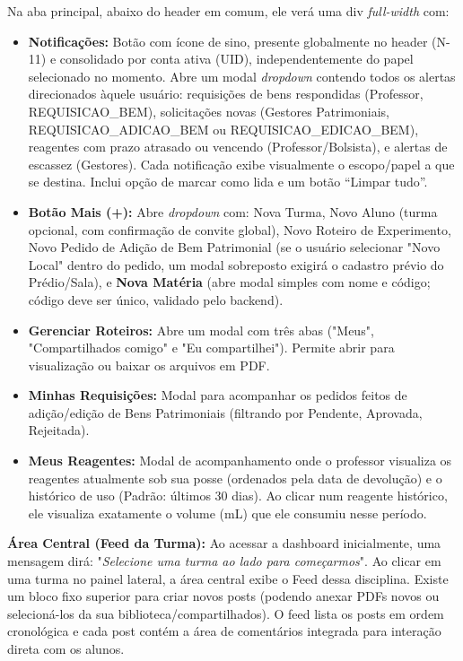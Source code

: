 Na aba principal, abaixo do header em comum, ele verá uma div \textit{full-width} com:
\begin{itemize}
    \item \textbf{Notificações:} Botão com ícone de sino, presente globalmente no header (N-11) e consolidado por conta ativa (UID), independentemente do papel selecionado no momento. Abre um modal \textit{dropdown} contendo todos os alertas direcionados àquele usuário: requisições de bens respondidas (Professor, REQUISICAO\_BEM), solicitações novas (Gestores Patrimoniais, REQUISICAO\_ADICAO\_BEM ou REQUISICAO\_EDICAO\_BEM), reagentes com prazo atrasado ou vencendo (Professor/Bolsista), e alertas de escassez (Gestores). Cada notificação exibe visualmente o escopo/papel a que se destina. Inclui opção de marcar como lida e um botão ``Limpar tudo''.
    \item \textbf{Botão Mais (+):} Abre \textit{dropdown} com: Nova Turma, Novo Aluno (turma opcional, com confirmação de convite global), Novo Roteiro de Experimento, Novo Pedido de Adição de Bem Patrimonial (se o usuário selecionar "Novo Local" dentro do pedido, um modal sobreposto exigirá o cadastro prévio do Prédio/Sala), e \textbf{Nova Matéria} (abre modal simples com nome e código; código deve ser único, validado pelo backend).
    \item \textbf{Gerenciar Roteiros:} Abre um modal com três abas ("Meus", "Compartilhados comigo" e "Eu compartilhei"). Permite abrir para visualização ou baixar os arquivos em PDF.
    \item \textbf{Minhas Requisições:} Modal para acompanhar os pedidos feitos de adição/edição de Bens Patrimoniais (filtrando por Pendente, Aprovada, Rejeitada).
    \item \textbf{Meus Reagentes:} Modal de acompanhamento onde o professor visualiza os reagentes atualmente sob sua posse (ordenados pela data de devolução) e o histórico de uso (Padrão: últimos 30 dias). Ao clicar num reagente histórico, ele visualiza exatamente o volume (mL) que ele consumiu nesse período.
\end{itemize}

\textbf{Área Central (Feed da Turma):}
Ao acessar a dashboard inicialmente, uma mensagem dirá: "\textit{Selecione uma turma ao lado para começarmos}".
Ao clicar em uma turma no painel lateral, a área central exibe o Feed dessa disciplina. Existe um bloco fixo superior para criar novos posts (podendo anexar PDFs novos ou selecioná-los da sua biblioteca/compartilhados). O feed lista os posts em ordem cronológica e cada post contém a área de comentários integrada para interação direta com os alunos.

